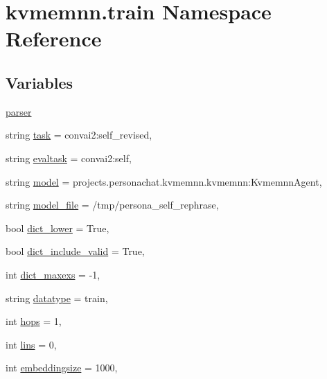 \hypertarget{namespacekvmemnn_1_1train}{}\section{kvmemnn.\+train Namespace Reference}
\label{namespacekvmemnn_1_1train}
\subsection*{Variables}
\begin{DoxyCompactItemize}
\item 
\hyperlink{namespacekvmemnn_1_1train_ae5f5c954c5bd240b7abaf43df88b8249}{parser}
\item 
string \hyperlink{namespacekvmemnn_1_1train_a1f3f68e73ff8303f115901bac4785053}{task} = \textquotesingle{}convai2\+:self\+\_\+revised\textquotesingle{},
\item 
string \hyperlink{namespacekvmemnn_1_1train_a38e0b7afd6cd8e82dae85106d7f93bae}{evaltask} = \textquotesingle{}convai2\+:self\textquotesingle{},
\item 
string \hyperlink{namespacekvmemnn_1_1train_a295d391825ef46a100bbc54ceecfce50}{model} = \textquotesingle{}projects.\+personachat.\+kvmemnn.\+kvmemnn\+:\+Kvmemnn\+Agent\textquotesingle{},
\item 
string \hyperlink{namespacekvmemnn_1_1train_af40a9f0a0c03477461ed12c59aa92784}{model\+\_\+file} = \textquotesingle{}/tmp/persona\+\_\+self\+\_\+rephrase\textquotesingle{},
\item 
bool \hyperlink{namespacekvmemnn_1_1train_a4dbed6f79905112e34652ea51dbfb24a}{dict\+\_\+lower} = True,
\item 
bool \hyperlink{namespacekvmemnn_1_1train_ae14ade3ab48f7d429bb1c0a03049c28d}{dict\+\_\+include\+\_\+valid} = True,
\item 
int \hyperlink{namespacekvmemnn_1_1train_ab4bd9f1b7bfb94dd649173ed3fa04398}{dict\+\_\+maxexs} = -\/1,
\item 
string \hyperlink{namespacekvmemnn_1_1train_ae9856540daf7f37b0fea5722e42acbb2}{datatype} = \textquotesingle{}train\textquotesingle{},
\item 
int \hyperlink{namespacekvmemnn_1_1train_a8f006fc845b91bec677d235c71de22fe}{hops} = 1,
\item 
int \hyperlink{namespacekvmemnn_1_1train_a73c8f737e4ce5434bf4b19cebd9fc8b3}{lins} = 0,
\item 
int \hyperlink{namespacekvmemnn_1_1train_af8b2545a200366dc488fc6209e7d6de4}{embeddingsize} = 1000,
\item 

\end{DoxyCompactItemize}
